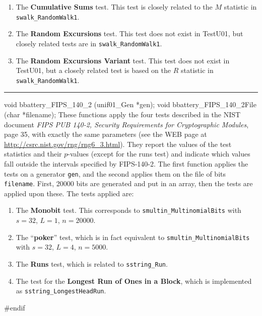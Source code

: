 \begin{enumerate}
\item The {\bf Cumulative Sums} test. This test is  closely related to the $M$ 
 statistic in  {\tt swalk\_RandomWalk1}.

\item The {\bf Random Excursions} test. This test does not
exist in TestU01, but closely related tests are in
  {\tt swalk\_RandomWalk1}. 

\item The {\bf Random Excursions Variant} test.  This test does not
exist in TestU01, but a closely related test is based on the $R$ statistic in
  {\tt swalk\_RandomWalk1}. 

\end{enumerate}


\bigskip
\hrule
\code


void bbattery_FIPS_140_2 (unif01_Gen *gen);
void bbattery_FIPS_140_2File (char *filename);
\endcode
\tab 
{}%
 These functions apply the four tests described in the NIST document 
 {\sl FIPS PUB 140-2, Security Requirements for Cryptographic Modules},
 page 35, with exactly the same parameters (see the WEB page at
  \url{http://csrc.nist.gov/rng/rng6_3.html}).  They report the values
 of the test statistics and their $p$-values (except for the runs test)
 and indicate which values fall outside the intervals specified by
 FIPS-140-2. The first function applies the tests on a generator {\tt gen},
 and the second applies them on the file of bits {\tt filename}. First, 
 20000 bits are generated and put in an array, then the tests are applied
 upon these. The tests applied are:
\endtab

\begin{enumerate}
\item The {\bf Monobit} test. This corresponds to
 {\tt smultin\_MultinomialBits} with $s=32$, $L=1$, $n=20000$.
 
\item The ``{\bf poker}'' test, which is in fact equivalent to
 {\tt smultin\_MultinomialBits} with $s=32$, $L=4$, $n=5000$.

\item The {\bf Runs} test, which is related to {\tt sstring\_Run}.

\item The test for the {\bf Longest Run of Ones in a Block},
 which is implemented as {\tt sstring\_LongestHeadRun}.
\end{enumerate}


\code
\hide
#endif
\endhide
\endcode
